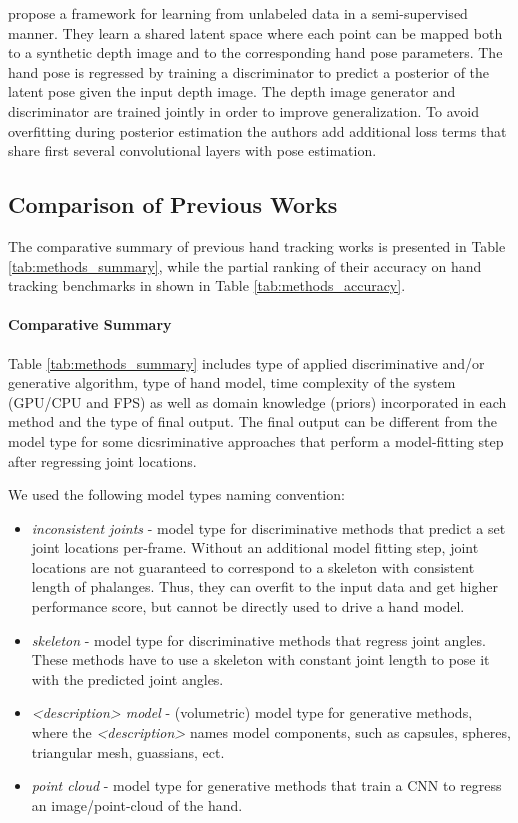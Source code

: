 \hspace{-0.4em}
\textbf{\cite{wan2017crossing}} 
propose a framework for learning from unlabeled data in a semi-supervised manner. They learn a shared latent space where each point can be mapped both to a synthetic depth image and to the corresponding hand pose parameters. The hand pose is regressed by training a discriminator to predict a posterior of the latent pose given the input depth image. The depth image generator and discriminator are trained jointly in order to improve generalization. To avoid overfitting during posterior estimation the authors add  additional loss terms that share first several convolutional layers with pose estimation.

\subsection{Comparison of Previous Works}
The comparative summary of previous hand tracking works is presented in Table \ref{tab:methods_summary}, while the partial ranking of their accuracy on hand tracking benchmarks in shown in Table \ref{tab:methods_accuracy}. 

\paragraph{Comparative Summary} Table \ref{tab:methods_summary} includes type of applied discriminative and/or generative algorithm, type of hand model, time complexity of the system (GPU/CPU and FPS) as well as domain knowledge (priors) incorporated in each method and the type of final output. The final output can be different from the model type for some dicsriminative approaches that perform a model-fitting step after regressing joint locations. 

We used the following model types naming convention: 
\vspace{-1em}
\begin{itemize}
\item \textit{inconsistent joints} - model type for discriminative methods that predict a set joint locations per-frame. Without an additional model fitting step, joint locations are not guaranteed to correspond to a skeleton with consistent length of phalanges. Thus, they can overfit to the input data and get higher performance score, but cannot be directly used to drive a hand model.
\item \textit{skeleton} - model type for discriminative methods that regress joint angles. These methods have to use a skeleton with constant joint length to pose it with the predicted joint angles.
\item \textit{<description> model} - (volumetric) model type for generative methods, where the \textit{<description>} names model components, such as capsules, spheres, triangular mesh, guassians, ect.
\item \textit{point cloud} - model type for generative methods that train a CNN to regress an image/point-cloud of the hand.
\end{itemize}

